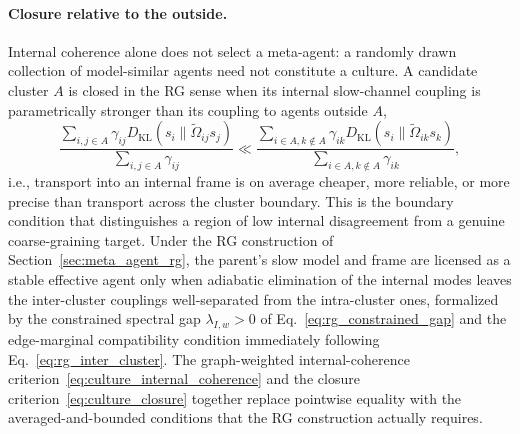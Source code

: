 \documentclass[11pt]{article}
\begin{document}
\paragraph{Closure relative to the outside.}
Internal coherence alone does not select a meta-agent: a randomly drawn collection of model-similar agents need not constitute a culture. A candidate cluster $A$ is closed in the RG sense when its internal slow-channel coupling is parametrically stronger than its coupling to agents outside $A$,
\begin{equation}
\frac{\sum_{i,j \in A}\gamma_{ij} D_{\mathrm{KL}}(s_i \| \tilde\Omega_{ij} s_j)}{\sum_{i,j \in A}\gamma_{ij}} \ll \frac{\sum_{i \in A, k \notin A}\gamma_{ik} D_{\mathrm{KL}}(s_i \| \tilde\Omega_{ik} s_k)}{\sum_{i \in A, k \notin A}\gamma_{ik}},
\label{eq:culture_closure}
\end{equation}
i.e., transport into an internal frame is on average cheaper, more reliable, or more precise than transport across the cluster boundary. This is the boundary condition that distinguishes a region of low internal disagreement from a genuine coarse-graining target. Under the RG construction of Section~\ref{sec:meta_agent_rg}, the parent's slow model and frame are licensed as a stable effective agent only when adiabatic elimination of the internal modes leaves the inter-cluster couplings well-separated from the intra-cluster ones, formalized by the constrained spectral gap $\lambda_{I,w} > 0$ of Eq.~\eqref{eq:rg_constrained_gap} and the edge-marginal compatibility condition immediately following Eq.~\eqref{eq:rg_inter_cluster}. The graph-weighted internal-coherence criterion~\eqref{eq:culture_internal_coherence} and the closure criterion~\eqref{eq:culture_closure} together replace pointwise equality with the averaged-and-bounded conditions that the RG construction actually requires.
\end{document}
